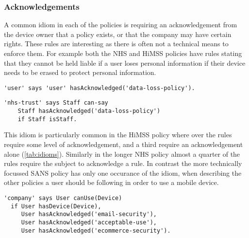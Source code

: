 \documentclass[a4paper]{article}
\begin{document}
\subsubsection{Acknowledgements}

A common idiom in each of the policies is requiring an acknowledgement from the device owner that a policy exists, or that the company may have certain rights.  
These rules are interesting as there is often not a technical means to enforce them.
For example both the NHS and HiMSS policies have rules stating that they cannot be held liable if a user loses personal information if their device needs to be erased to protect personal information.

\begin{lstlisting}[title={\footnotesize\textbf{\ac{HiMSS}}:~\itshape 
I agree to hold XYZ Health System harmless for any loss relating to the administration of PDA/Smartphone connectivity to XYZ Health System systems including, but not limited to, loss of personal information stored on a PDA/Smartphone due to data deletion done to protect sensitive information related to XYZ Health System, its patients, members or partners.}]
'user' says 'user' hasAcknowledged('data-loss-policy').
\end{lstlisting}

\begin{lstlisting}[title={\footnotesize\textbf{NHS}:~\itshape 
Individuals who have personal data of any kind stored on a corporately issued mobile device must be aware that in the event of loss of the device the above data wipe will include removal of all personal data.}]
'nhs-trust' says Staff can-say
	Staff hasAcknowledged('data-loss-policy') 
	if Staff isStaff.
\end{lstlisting}

This idiom is particularly common in the \ac{HiMSS} policy where over the rules require some level of acknowledgement, and a third require an acknowledgement alone (\autoref{tab:idioms}).
Similarly in the longer NHS policy almost a quarter of the rules require the subject to acknowledge a rule.
In contrast the more technically focussed SANS policy has only one occurance of the idiom, when describing the other policies a user should be following in order to use a mobile device.

\begin{lstlisting}[title={\footnotesize\textbf{\ac{SANS}}:~\itshape 
Users MUST agree to the email security/acceptable use policy and eventually to the eCommerce security policy.}]
'company' says User canUse(Device) 
  if User hasDevice(Device),
     User hasAcknowledged('email-security'),
     User hasAcknowledged('acceptable-use'), 
     User hasAcknowledged('ecommerce-security').
\end{lstlisting}
\end{document}
